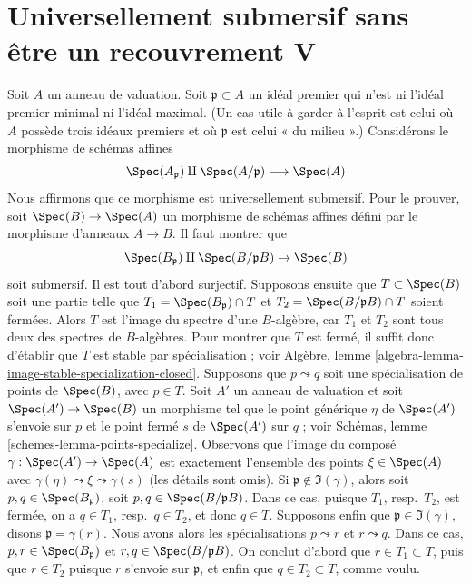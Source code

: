 \section{Universellement submersif sans être un recouvrement V}
\label{section-universally-submersive-not-V}

\noindent
Soit $A$ un anneau de valuation. Soit $\mathfrak p \subset A$ un idéal
premier qui n'est ni l'idéal premier minimal ni l'idéal maximal.
(Un cas utile à garder à l'esprit est celui où $A$ possède trois idéaux
premiers et où $\mathfrak p$ est celui « du milieu ».)
Considérons le morphisme de schémas affines
$$
\Spec(A_\mathfrak p) \amalg \Spec(A/\mathfrak p) \longrightarrow \Spec(A)
$$
Nous affirmons que ce morphisme est universellement submersif. Pour le prouver,
soit $\Spec(B) \to \Spec(A)$ un morphisme de schémas affines défini par
le morphisme d'anneaux $A \to B$. Il faut montrer que
$$
\Spec(B_\mathfrak p) \amalg \Spec(B/\mathfrak pB) \to \Spec(B)
$$
soit submersif. Il est tout d'abord surjectif. Supposons ensuite que
$T \subset \Spec(B)$ soit une partie telle que
$T_1 = \Spec(B_\mathfrak p) \cap T$ et
$T_2 = \Spec(B/\mathfrak p B) \cap T$ soient fermées. Alors $T$ est l'image
du spectre d'une $B$-algèbre, car $T_1$ et $T_2$ sont tous deux des spectres
de $B$-algèbres. Pour montrer que $T$ est fermé, il suffit donc d'établir
que $T$ est stable par spécialisation ; voir
Algèbre, lemme \ref{algebra-lemma-image-stable-specialization-closed}.
Supposons que $p \leadsto q$ soit une spécialisation de points de
$\Spec(B)$, avec $p \in T$. Soit $A'$ un anneau de valuation et soit
$\Spec(A') \to \Spec(B)$ un morphisme tel que le point générique $\eta$
de $\Spec(A')$ s'envoie sur $p$ et le point fermé $s$ de $\Spec(A')$ sur $q$ ; voir
Schémas, lemme \ref{schemes-lemma-points-specialize}.
Observons que l'image du composé $\gamma : \Spec(A') \to \Spec(A)$
est exactement
l'ensemble des points
$\xi \in \Spec(A)$ avec $\gamma(\eta) \leadsto \xi \leadsto \gamma(s)$ (les détails sont omis).
Si $\mathfrak p \not \in \Im(\gamma)$, alors soit
$p, q \in \Spec(B_\mathfrak p)$, soit
$p, q \in \Spec(B/\mathfrak pB)$. Dans ce cas, puisque
$T_1$, resp.\ $T_2$, est fermée,
on a $q \in T_1$, resp.\ $q \in T_2$, et donc $q \in T$.
Supposons enfin que $\mathfrak p \in \Im(\gamma)$, disons
$\mathfrak p = \gamma(r)$. Nous avons alors les spécialisations
$p \leadsto r$ et $r \leadsto q$. Dans ce cas,
$p, r \in \Spec(B_\mathfrak p)$ et
$r, q \in \Spec(B/\mathfrak pB)$. On conclut d'abord que
$r \in T_1 \subset T$, puis que $r \in T_2$ puisque $r$ s'envoie sur
$\mathfrak p$, et enfin que $q \in T_2 \subset T$, comme voulu.

